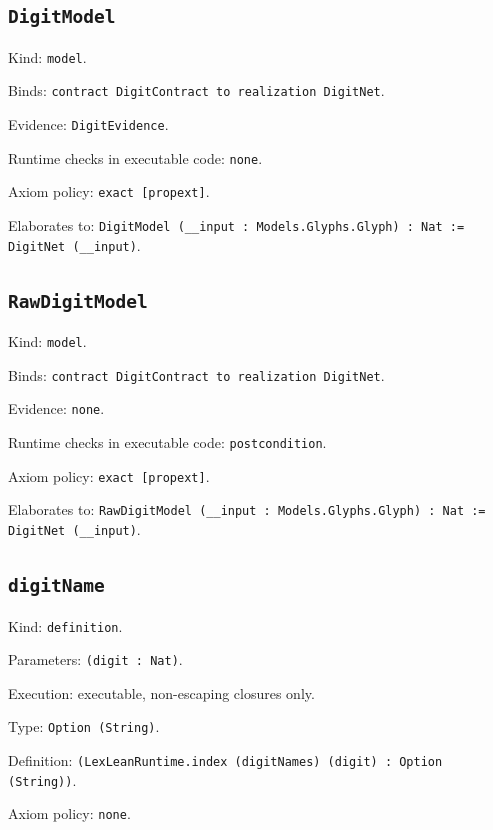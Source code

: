 \documentclass[11pt]{article}
\begin{document}
\subsection*{\texttt{DigitModel}}
\noindent Kind: \texttt{model}.\par
\noindent Binds: \texttt{contract DigitContract to realization DigitNet}.\par
\noindent Evidence: \texttt{DigitEvidence}.\par
\noindent Runtime checks in executable code: \texttt{none}.\par
\noindent Axiom policy: \texttt{exact [propext]}.\par
\noindent Elaborates to: \texttt{DigitModel (\_\_input : Models.Glyphs.Glyph) : Nat := DigitNet (\_\_input)}.\par
\subsection*{\texttt{RawDigitModel}}
\noindent Kind: \texttt{model}.\par
\noindent Binds: \texttt{contract DigitContract to realization DigitNet}.\par
\noindent Evidence: \texttt{none}.\par
\noindent Runtime checks in executable code: \texttt{postcondition}.\par
\noindent Axiom policy: \texttt{exact [propext]}.\par
\noindent Elaborates to: \texttt{RawDigitModel (\_\_input : Models.Glyphs.Glyph) : Nat := DigitNet (\_\_input)}.\par
\subsection*{\texttt{digitName}}
\noindent Kind: \texttt{definition}.\par
\noindent Parameters: \texttt{(digit : Nat)}.\par
\noindent Execution: executable, non-escaping closures only.\par
\noindent Type: \texttt{Option (String)}.\par
\noindent Definition: \texttt{(LexLeanRuntime.index (digitNames) (digit) : Option (String))}.\par
\noindent Axiom policy: \texttt{none}.\par
\end{document}
